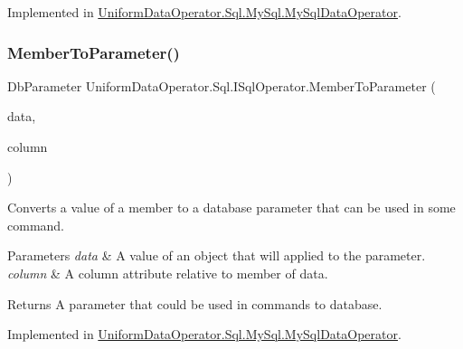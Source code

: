 Implemented in \mbox{\hyperlink{class_uniform_data_operator_1_1_sql_1_1_my_sql_1_1_my_sql_data_operator_a5aad834d2ceba598037b6ed19b27db6d}{Uniform\+Data\+Operator.\+Sql.\+My\+Sql.\+My\+Sql\+Data\+Operator}}.

\mbox{\label{interface_uniform_data_operator_1_1_sql_1_1_i_sql_operator_ac09f73e97974a4bd697046e0c54a93d3}} 
\subsubsection{\texorpdfstring{Member\+To\+Parameter()}{MemberToParameter()}}
{\footnotesize\ttfamily Db\+Parameter Uniform\+Data\+Operator.\+Sql.\+I\+Sql\+Operator.\+Member\+To\+Parameter (\begin{DoxyParamCaption}\item[{object}]{data,  }\item[{\mbox{\hyperlink{class_uniform_data_operator_1_1_sql_1_1_markup_1_1_column_attribute}{Column\+Attribute}}}]{column }\end{DoxyParamCaption})}



Converts a value of a member to a database parameter that can be used in some command. 


\begin{DoxyParams}{Parameters}
{\em data} & A value of an object that will applied to the parameter.\\
\hline
{\em column} & A column attribute relative to member of data.\\
\hline
\end{DoxyParams}
\begin{DoxyReturn}{Returns}
A parameter that could be used in commands to database. 
\end{DoxyReturn}


Implemented in \mbox{\hyperlink{class_uniform_data_operator_1_1_sql_1_1_my_sql_1_1_my_sql_data_operator_a4f878911e378a4ece16d93f4c3352234}{Uniform\+Data\+Operator.\+Sql.\+My\+Sql.\+My\+Sql\+Data\+Operator}}.

\mbox{\label{interface_uniform_data_operator_1_1_sql_1_1_i_sql_operator_afc0fd8b8c82515c498a6959453f331f1}} 

